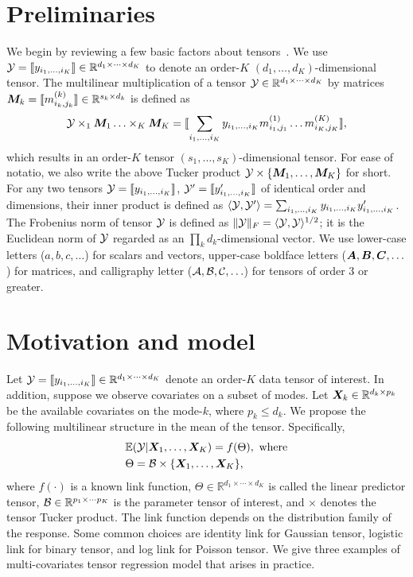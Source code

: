 \documentclass[twoside]{article}
\theoremstyle{plain}
\theoremstyle{definition}
\begin{document}
\section{Preliminaries}

We begin by reviewing a few basic factors about tensors~\cite{kolda2009tensor}. We use $\mathcal{Y}=\llbracket y_{i_1,\ldots,i_K} \rrbracket\in \mathbb{R}^{d_1\times \cdots\times d_K}$ to denote an order-$K$ $(d_1,\ldots,d_K)$-dimensional tensor. The multilinear multiplication of a tensor $\mathcal{Y}\in\mathbb{R}^{d_1\times \cdots\times d_K}$ by matrices $\bm M_k=\llbracket m_{i_k,j_k}^{(k)} \rrbracket\in\mathbb{R}^{s_k\times d_k}$ is defined as
\[
\mathcal{Y} \times_1\bm M_1\ldots \times_K \bm M_K=\llbracket \sum_{i_1,\ldots,i_K}y_{i_1,\ldots,i_K}m_{i_1,j_1}^{(1)}\ldots m_{i_K,j_K}^{(K)} \rrbracket,
\]
which results in an order-$K$ tensor $(s_1,\ldots,s_K)$-dimensional tensor. For ease of notatio, we also write the above Tucker product $\mathcal{Y}\times\{\bm M_1,\ldots,\bm M_K\}$ for short. For any two tensors $\mathcal{Y}=\llbracket y_{i_1,\ldots,i_K} \rrbracket$, $\mathcal{Y}'=\llbracket y'_{i_1,\ldots,i_K} \rrbracket$ of identical order and dimensions, their inner product is defined as $\langle \mathcal{Y}, \mathcal{Y}'\rangle =\sum_{i_1,\ldots,i_K}y_{i_1,\ldots,i_K}y'_{i_1,\ldots,i_K}$. The Frobenius norm of tensor $\mathcal{Y}$ is defined as $\lVert\mathcal{Y}\rVert_F=\langle \mathcal{Y}, \mathcal{Y} \rangle^{1/2}$; it is the Euclidean norm of $\mathcal{Y}$ regarded as an $\prod_k d_k$-dimensional vector. We use lower-case letters ($a,b,c,\ldots$) for scalars and vectors, upper-case boldface letters ($\bm A,\bm B,\bm C,\ldots$) for matrices, and calligraphy letter ($\mathcal{A}, \mathcal{B}, \mathcal{C},\ldots$) for tensors of order 3 or greater. 


\section{Motivation and model}
Let $\mathcal{Y}=\llbracket y_{i_1,\ldots,i_K} \rrbracket\in\mathbb{R}^{d_1\times \cdots\times d_K}$ denote an order-$K$ data tensor of interest. In addition, suppose we observe covariates on a subset of modes. Let $\bm X_k\in\mathbb{R}^{d_k\times p_k}$ be the available covariates on the mode-$k$, where $p_k\leq d_k$. We propose the following multilinear structure in the mean of the tensor. Specifically, 
\begin{align}\label{eq:tensormodel}
&\mathbb{E}(\mathcal{Y}|\bm X_1,\ldots,\bm X_K)=f(\Theta),\ \text{where}\\
&\Theta =\mathcal{B}\times\{\bm X_1,\ldots,\bm X_K\} ,
\end{align}
where $f(\cdot)$ is a known link function, $\Theta\in\mathbb{R}^{d_1\times \cdots\times d_K}$ is called the linear predictor tensor, $\mathcal{B}\in\mathbb{R}^{p_1\times \cdots p_K}$ is the parameter tensor of interest, and $\times$ denotes the tensor Tucker product. The link function depends on the distribution family of the response. Some common choices are identity link for Gaussian tensor, logistic link for binary tensor, and log link for Poisson tensor. We give three examples of multi-covariates tensor regression model that arises in practice. 
\end{document}
